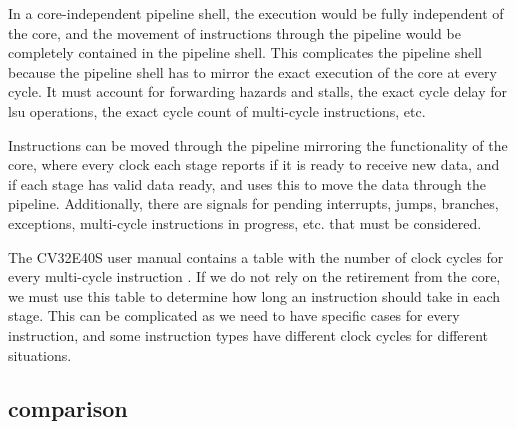 In a core-independent pipeline shell, the execution would be fully independent of the core, and the movement of instructions through the pipeline would be completely contained in the pipeline shell. This complicates the pipeline shell because the pipeline shell has to mirror the exact execution of the core at every cycle. It must account for forwarding hazards and stalls, the exact cycle delay for \acrshort{lsu} operations, the exact cycle count of multi-cycle instructions, etc.

Instructions can be moved through the pipeline mirroring the functionality of the core, where every clock each stage reports if it is ready to receive new data, and if each stage has valid data ready, and uses this to move the data through the pipeline. Additionally, there are signals for pending interrupts, jumps, branches, exceptions, multi-cycle instructions in progress, etc. that must be considered. 

The CV32E40S user manual contains a table with the number of clock cycles for every multi-cycle instruction \cite{openhwgroupPipelineDetails2023}. If we do not rely on the retirement from the core, we must use this table to determine how long an instruction should take in each stage. This can be complicated as we need to have specific cases for every instruction, and some instruction types have different clock cycles for different situations.


\subsection{comparison}

